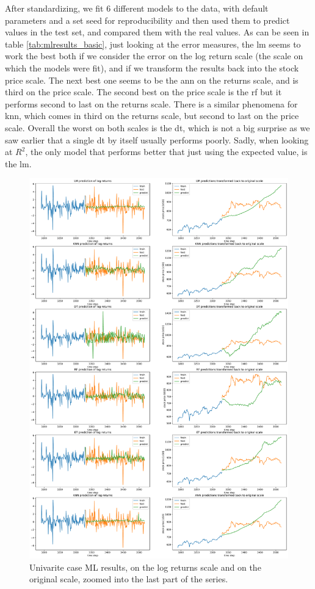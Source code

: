 After standardizing, we fit 6 different models to the data, with default parameters and a set seed for reproducibility and then used them to predict values in the test set, and compared them with the real values. As can be seen in table \ref{tab:mlresults_basic}, just looking at the error measures, the \acrlong{lm} seems to work the best both if we consider the error on the log return scale (the scale on which the models were fit), and if we transform the results back into the stock price scale. The next best one seems to be the \acrlong{ann} on the returns scale, and is third on the price scale. The second best on the price scale is the \acrlong{rf}  but it performs second to last on the returns scale. There is a similar phenomena for \acrshort{knn}, which comes in third on the returns scale, but second to last on the price scale. Overall the worst on both scales is the \acrlong{dt}, which is not a big surprise as we saw earlier that a single \acrshort{dt} by itself usually performs poorly. Sadly, when looking at $R^2$, the only model that performs better that just using the expected value, is the \acrlong{lm}.

\begin{figure}
	\centering
	\includegraphics[width=\textwidth]{img/img_mlresults_basic.pdf}
	\caption{Univarite case ML results, on the log returns scale and on the original scale, zoomed into the last part of the series.}
	\label{fig:mlresults_basic}
\end{figure}

